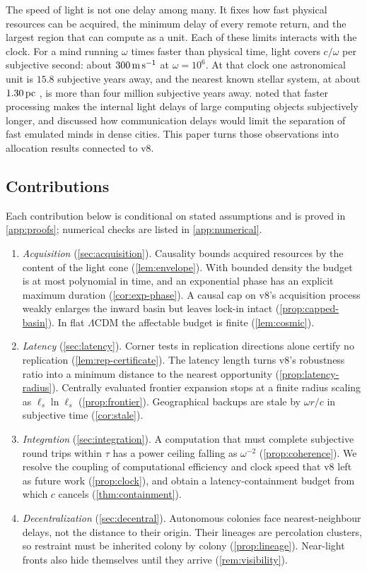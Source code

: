 \documentclass[11pt,a4paper]{article}
\theoremstyle{definition}
\newcommand{\ls}{\ell_s}
\begin{document}
The speed of light is not one delay among many. It fixes how fast physical
resources can be acquired, the minimum delay of every remote return, and the
largest region that can compute as a unit. Each of these limits interacts with
the clock. For a mind running $\omega$ times faster than physical time, light
covers $c/\omega$ per subjective second: about $300\,{\rm m\,s^{-1}}$ at
$\omega=10^6$. At that clock one astronomical unit is $15.8$ subjective years
away, and the nearest known stellar system, at about $1.30\,{\rm pc}$
\citep{Reyle2021}, is more than four million subjective years away.
 noted that faster processing makes the internal
light delays of large computing objects subjectively longer, and
\citet{Hanson2016Em} discussed how communication delays would limit the
separation of fast emulated minds in dense cities. This paper turns those
observations into allocation results connected to v8.

\subsection{Contributions}
Each contribution below is conditional on stated assumptions and is proved in
\cref{app:proofs}; numerical checks are listed in \cref{app:numerical}.
\begin{enumerate}[leftmargin=*,itemsep=2pt]
\item \emph{Acquisition} (\cref{sec:acquisition}). Causality bounds acquired
resources by the content of the light cone (\cref{lem:envelope}). With bounded
density the budget is at most polynomial in time, and an exponential phase has
an explicit maximum duration (\cref{cor:exp-phase}). A causal cap on v8's
acquisition process weakly enlarges the inward basin but leaves lock-in
intact (\cref{prop:capped-basin}). In flat $\Lambda$CDM the affectable budget
is finite (\cref{lem:cosmic}).
\item \emph{Latency} (\cref{sec:latency}). Corner tests in replication directions
alone certify no replication (\cref{lem:rep-certificate}). The latency length
turns v8's robustness ratio into a minimum distance to the nearest opportunity
(\cref{prop:latency-radius}). Centrally evaluated frontier expansion stops at
a finite radius scaling as $\ls\ln\ls$ (\cref{prop:frontier}).
Geographical backups are stale by $\omega r/c$ in subjective time (\cref{cor:stale}).
\item \emph{Integration} (\cref{sec:integration}). A computation that must
complete subjective round trips within $\tau$ has a power ceiling falling as
$\omega^{-2}$ (\cref{prop:coherence}). We resolve the coupling of computational
efficiency and clock speed that v8 left as future work (\cref{prop:clock}), and
obtain a latency-containment budget from which $c$ cancels (\cref{thm:containment}).
\item \emph{Decentralization} (\cref{sec:decentral}). Autonomous colonies face
nearest-neighbour delays, not the distance to their origin. Their lineages are
percolation clusters, so restraint must be inherited colony by colony
(\cref{prop:lineage}). Near-light fronts also hide themselves until they
arrive (\cref{rem:visibility}).
\end{enumerate}
\end{document}
